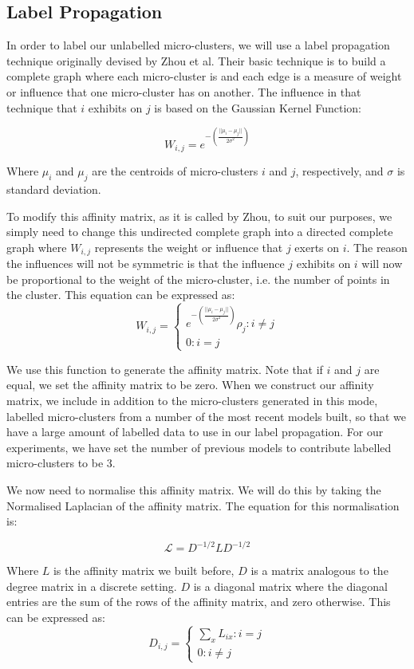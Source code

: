 \documentclass[12pt,a4paper,oneside]{report}
\begin{document}
\subsection*{Label Propagation}

In order to label our unlabelled micro-clusters, we will use a label propagation technique originally devised by Zhou et al\cite{LabProp}. Their basic technique is to build a complete graph where each micro-cluster is and each edge is a measure of weight or influence that one micro-cluster has on another. The influence in that technique that \(i\) exhibits on \(j\) is based on the Gaussian Kernel Function:

\[W_{i,j} = e^{-(\frac{||\mu_i-\mu_j||}{2\sigma^2})}\]

Where \(\mu_i\) and \(\mu_j\) are the centroids of micro-clusters \(i\) and \(j\), respectively, and $\sigma$ is standard deviation. 

To modify this affinity matrix, as it is called by Zhou, to suit our purposes, we simply need to change this undirected complete graph into a directed complete graph where \(W_{i,j}\) represents the weight or influence that \(j\) exerts on \(i\). The reason the influences will not be symmetric is that the influence \(j\) exhibits on \(i\) will now be proportional to the weight of the micro-cluster, i.e. the number of points in the cluster. This equation can be expressed as:
\[
	W_{i,j} =
	\begin{cases}
	 e^{-(\frac{||\mu_i-\mu_j||}{2\sigma^2})}\rho_j : i \neq j \\
	0 :					 i  = j 
\end{cases}\] 

We use this function to generate the affinity matrix. Note that if $i$ and $j$ are equal, we set the affinity matrix to be zero. When we construct our affinity matrix, we include in addition to the micro-clusters generated in this mode, labelled micro-clusters from a number of the most recent models built, so that we have a large amount of labelled data to use in our label propagation. For our experiments, we have set the number of previous models to contribute labelled micro-clusters to be 3.

We now need to normalise this affinity matrix. We will do this by taking the Normalised Laplacian of the affinity matrix. The equation for this normalisation is:

\[ \mathscr{L} = D^{-1/2}LD^{-1/2}\] 

Where $L$ is the affinity matrix we built before,  $D$ is a matrix analogous to the degree matrix in a discrete setting. $D$ is a diagonal matrix where the diagonal entries are the sum of the rows of the affinity matrix, and zero otherwise. This can be expressed as:
\[
	D_{i,j} =
	\begin{cases} 
	 \sum_{x} L_{ix} : i = j \\
	0 :					 i  \neq j 
\end{cases}\] 
\end{document}
